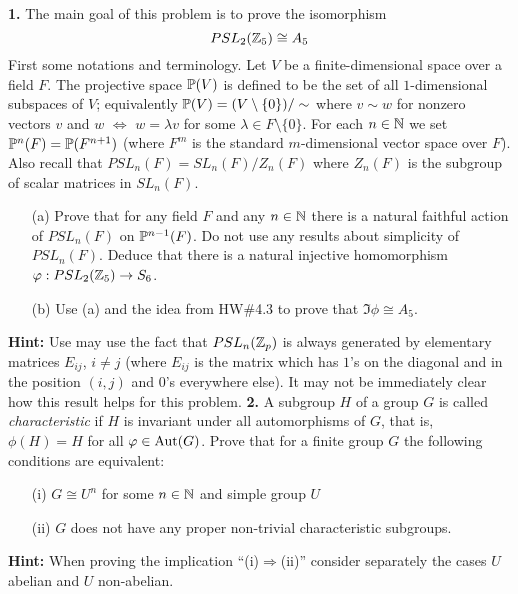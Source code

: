 \documentclass[12pt]{amsart}
\begin{document}
\skv
{\bf 1.} The main goal of this problem is to prove the isomorphism $$PSL_2({\mathbb Z}_5)\cong A_5$$
\skv
First some notations and terminology. Let $V$ be a finite-dimensional space over a field $F$. The projective space ${\mathbb P}(V)$ is defined to be the set of all $1$-dimensional subspaces of $V$; equivalently ${\mathbb P}(V)=(V\setminus\{0\})/\sim$ where $v\sim w$ for nonzero vectors $v$ and $w$
$\iff$ $w=\lambda v$ for some $\lambda\in F\setminus\{0\}$. For each $n\in{\mathbb N}$ we set ${\mathbb P}^n(F)={\mathbb P}(F^{n+1})$ (where $F^{m}$ is the standard $m$-dimensional vector space over $F$). Also recall that $PSL_n(F)=SL_n(F)/Z_n(F)$ where $Z_n(F)$ is the subgroup of scalar matrices in $SL_n(F)$.
\skv
\begin{itemize}
\item[(a)] Prove that for any field $F$ and any $n\in{\mathbb N}$ there is a natural faithful action of $PSL_n(F)$ on ${\mathbb P}^{n-1}(F)$. Do not use any results about simplicity of $PSL_n(F)$. Deduce that there is a natural injective homomorphism ${\varphi}:PSL_2({\mathbb Z}_5)\to S_6$.
\item[(b)] Use (a) and the idea from HW\#4.3 to prove that $\Im\phi\cong A_5$.
\end{itemize}
{\bf Hint:} Use may use the fact that $PSL_n({\mathbb Z}_p)$ is always generated by elementary matrices $E_{ij}$, $i\neq j$ (where $E_{ij}$ is the matrix which has $1$'s on the diagonal and in the position $(i,j)$ and $0$'s everywhere else). It may not be immediately clear how this result helps for this problem. 
\skv
{\bf 2.} A subgroup $H$ of a group $G$ is called {\it characteristic} if $H$ is invariant under all automorphisms of $G$, that is,
$\phi(H)=H$ for all ${\varphi}\in {\rm Aut}(G)$. Prove that for a finite group $G$ the following conditions are equivalent:
\begin{itemize}
\item[(i)] $G\cong U^n$ for some $n\in{\mathbb N}$ and simple group $U$
\item[(ii)] $G$ does not have any proper non-trivial characteristic subgroups.
\end{itemize}
{\bf Hint:} When proving the implication ``(i)$\Rightarrow$(ii)'' consider separately the cases $U$ abelian and $U$ non-abelian.
\end{document}
